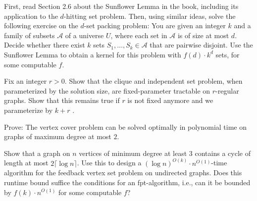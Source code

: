 \begin{exercise}
First, read Section 2.6 about the Sunflower Lemma in the book, including its application to the $d$-hitting set problem.
Then, using similar ideas, solve the following exercise on the $d$-set packing problem:
You are given an integer $k$ and a family of subsets $\mathcal{A}$ of a universe $U$, where each set in $\mathcal{A}$ is of size at most $d$. Decide whether there exist $k$ sets $S_1,\ldots,S_k \in \mathcal{A}$ that are pairwise disjoint.
Use the Sunflower Lemma to obtain a kernel for this problem with $f(d)\cdot k^d$ sets, for some computable $f$.
\end{exercise}

\begin{exercise}[\easy]
Fix an integer $r > 0$. 
Show that the clique and independent set problem, when parameterized by the solution size, are fixed-parameter tractable on $r$-regular graphs.
Show that this remains true if $r$ is not fixed anymore and we parameterize by $k+r$ .
\end{exercise}

\begin{exercise}[\easy]
Prove: The vertex cover problem can be solved optimally in polynomial time on graphs of maximum degree at most $2$.
\end{exercise}

\begin{exercise}
Show that a graph on $n$ vertices of minimum degree at least $3$ contains a cycle of length at most $2\lceil \log n\rceil$.
Use this to design a $(\log n)^{O(k)} \cdot  n^{O(1)}$-time algorithm for the feedback vertex set problem on undirected graphs.
Does this runtime bound suffice the conditions for an fpt-algorithm, i.e., can it be bounded by $f(k) \cdot n^{O(1)}$ for some computable $f$?
\end{exercise}

